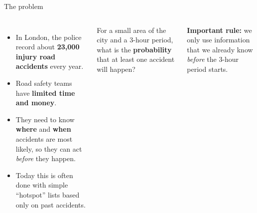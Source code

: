 \documentclass[aspectratio=169,11pt,t]{beamer}
\begin{document}
\begin{frame}{The problem}
\begin{columns}[T,onlytextwidth]
\begin{itemize}
  \item In London, the police record about \textbf{23,000 injury road accidents} every year.
  \item Road safety teams have \textbf{limited time and money}.
  \item They need to know \textbf{where} and \textbf{when} accidents are most likely,
        so they can act \emph{before} they happen.
  \item Today this is often done with simple ``hotspot'' lists based only on past accidents.
\end{itemize}
\begin{keybox}[title=Our question]
\large For a small area of the city and a 3-hour period, what is the
\textbf{probability} that at least one accident will happen?
\end{keybox}
\vspace{2mm}
\begin{softbox}\small
\textbf{Important rule:} we only use information that we already know
\emph{before} the 3-hour period starts.
\end{softbox}
\end{columns}
\end{frame}
\end{document}

